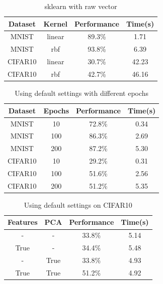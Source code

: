 \documentclass[conference]{IEEEtran}
\begin{document}
	\begin{table}[!h]
		\centering
		\caption{sklearn with raw vector}
		\begin{tabular}{cccc}
			\toprule
			Dataset & Kernel & Performance & Time(s) \\
			\midrule
			MNIST & linear & 89.3\% & 1.71 \\
			MNIST & rbf & 93.8\% & 6.39 \\
			CIFAR10 & linear & 30.7\% & 42.23 \\
			CIFAR10 & rbf & 42.7\% & 46.16 \\
			\bottomrule
		\end{tabular}
		\label{t1}
	\end{table}
	
	\begin{table}[!h]
		\centering
		\caption{Using default settings with different epochs}
		\begin{tabular}{cccc}
			\toprule
			Dataset & Epochs & Performance & Time(s) \\
			\midrule
			MNIST & 10 & 72.8\% & 0.34 \\
			MNIST & 100 & 86.3\% & 2.69 \\
			MNIST & 200 & 87.2\% & 5.30 \\
			CIFAR10 & 10 & 29.2\% & 0.31 \\
			CIFAR10 & 100 & 51.6\% & 2.56 \\
			CIFAR10 & 200 & 51.2\% & 5.35 \\
			\bottomrule
		\end{tabular}
		\label{t2}
	\end{table}
	
	\begin{table}[!h]
		\centering
		\caption{Using default settings on CIFAR10}
		\begin{tabular}{cccc}
			\toprule
			Features & PCA & Performance & Time(s) \\
			\midrule
			- & - & 33.8\% & 5.14 \\
			True & - & 34.4\% & 5.48 \\
			- & True & 33.8\% & 4.93 \\
			True & True & 51.2\% & 4.92 \\
			\bottomrule
		\end{tabular}
		\label{t3}
	\end{table}
	
\end{document}
